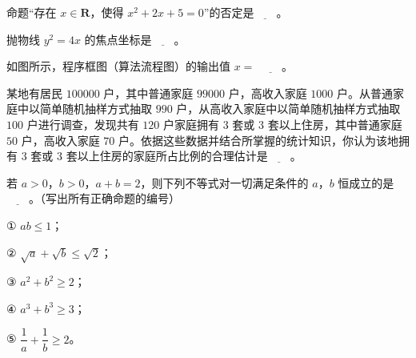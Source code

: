 \begin{question}
命题“存在 $x\in\mathbf R$，使得 $x^2+2x+5=0$”的否定是$\underline{\qquad}$。

\end{question}
\begin{question}
抛物线 $y^2=4x$ 的焦点坐标是$\underline{\qquad}$。

\Needspace{0.4\textheight}
\end{question}
\begingroup
\renewenvironment{question}{\Needspace{0.5\textheight}}{}
\begin{question}
如图所示，程序框图（算法流程图）的输出值 $x=$ $\underline{\qquad}$。
\nopagebreak[4]
\begin{center}\end{center}
\nopagebreak[4]
\end{question}
\endgroup
\begin{question}
某地有居民 $100000$ 户，其中普通家庭 $99000$ 户，高收入家庭 $1000$ 户。从普通家庭中以简单随机抽样方式抽取 $990$ 户，从高收入家庭中以简单随机抽样方式抽取 $100$ 户进行调查，发现共有 $120$ 户家庭拥有 $3$ 套或 $3$ 套以上住房，其中普通家庭 $50$ 户，高收入家庭 $70$ 户。依据这些数据并结合所掌握的统计知识，你认为该地拥有 $3$ 套或 $3$ 套以上住房的家庭所占比例的合理估计是$\underline{\qquad}$。

\end{question}
\begin{question}
若 $a>0$，$b>0$，$a+b=2$，则下列不等式对一切满足条件的 $a$，$b$ 恒成立的是$\underline{\qquad}$。（写出所有正确命题的编号）

① $ab\leqslant1$；

② $\sqrt a+\sqrt b\leqslant\sqrt2$；

③ $a^2+b^2\geqslant2$；

④ $a^3+b^3\geqslant3$；

⑤ $\dfrac1a+\dfrac1b\geqslant2$。

\end{question}

